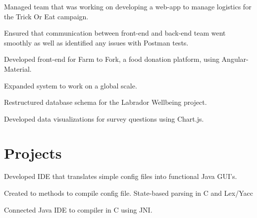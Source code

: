 \documentclass[letterpaper]{deedy-resume} %
\begin{document}
\begin{minipage}[t]{0.74\textwidth}
\begin{tightitemize}
\item Managed team that was working on developing a web-app to manage logistics for the Trick Or Eat campaign.
\item Ensured that communication between front-end and back-end team went smoothly as well as identified any issues with Postman tests. 
\end{tightitemize}

\sectionspace %


\begin{tightitemize}
\item Developed front-end for Farm to Fork, a food donation platform, using Angular-Material.
\item Expanded system to work on a global scale.
\end{tightitemize}

\sectionspace %

\begin{tightitemize}
\item Restructured database schema for the Labrador Wellbeing project.
\item Developed data visualizations for survey questions using Chart.js.
\end{tightitemize}






\section{Projects}



\begin{tightitemize}
\item Developed IDE that translates simple config files into functional Java GUI's.
\item Created to methods to compile config file. State-based parsing in C and Lex/Yacc
\item Connected Java IDE to compiler in C using JNI.
\end{tightitemize}
\sectionspace %


\end{minipage}
\end{document}
